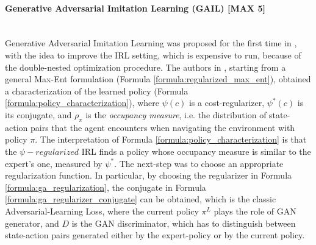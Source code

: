 \paragraph{Generative Adversarial Imitation Learning (GAIL) [MAX 5]} \mbox{} \\
Generative Adversarial Imitation Learning was proposed for the first time in \cite{ho2016gail}, with the idea to improve the IRL setting, which is expensive to run, because of the double-nested optimization procedure. The authors in \cite{ho2016gail}, starting from a general Max-Ent formulation (Formula \ref{formula:regularized_max_ent}), obtained a characterization of the learned policy (Formula \ref{formula:policy_characterization}), where $\psi(c)$ is a cost-regularizer, $\psi^{*}(c)$ is its conjugate, and $\rho_{\pi}$ is the \textit{occupancy measure}, i.e. the distribution of state-action pairs that the agent encounters when navigating the environment with policy $\pi$. The interpretation of Formula \ref{formula:policy_characterization} is that the $\psi-regularized$ IRL finds a policy whose occupancy measure is similar to the expert's one, measured by $\psi^{*}$. The next-step was to choose an appropriate regularization function. In particular, by choosing the regularizer in Formula \ref{formula:ga_regularization}, the conjugate in Formula \ref{formula:ga_regularizer_conjugate} can be obtained, which is the classic Adversarial-Learning Loss, where the current policy $\pi^{L}$ plays the role of GAN generator, and $D$ is the GAN discriminator, which has to distinguish between state-action pairs generated either by the expert-policy or by the current policy. 

